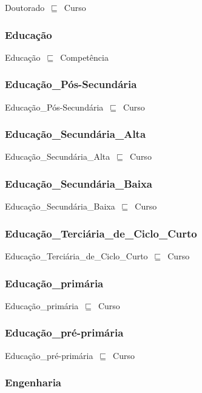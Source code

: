 \documentclass{article}
\begin{document}
Doutorado~\ensuremath{\sqsubseteq}~Curso~

\subsubsection*{Educação}

Educação~\ensuremath{\sqsubseteq}~Competência~

\subsubsection*{Educação\_Pós-Secundária}

Educação\_Pós-Secundária~\ensuremath{\sqsubseteq}~Curso~

\subsubsection*{Educação\_Secundária\_Alta}

Educação\_Secundária\_Alta~\ensuremath{\sqsubseteq}~Curso~

\subsubsection*{Educação\_Secundária\_Baixa}

Educação\_Secundária\_Baixa~\ensuremath{\sqsubseteq}~Curso~

\subsubsection*{Educação\_Terciária\_de\_Ciclo\_Curto}

Educação\_Terciária\_de\_Ciclo\_Curto~\ensuremath{\sqsubseteq}~Curso~

\subsubsection*{Educação\_primária}

Educação\_primária~\ensuremath{\sqsubseteq}~Curso~

\subsubsection*{Educação\_pré-primária}

Educação\_pré-primária~\ensuremath{\sqsubseteq}~Curso~

\subsubsection*{Engenharia}
\end{document}
